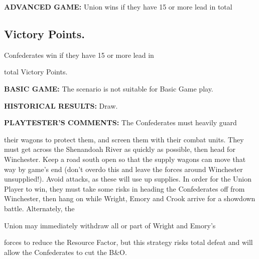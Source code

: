 \begin{scenariodata}
\textbf{ADVANCED GAME:} Union wins if they have 15 or more lead in total\\
\end{scenariodata}

\subsection*{Victory Points.}

\begin{scenariodata}
Confederates win if they have 15 or more lead in\\
\end{scenariodata}

total Victory Points.

\begin{scenariodata}
\textbf{BASIC GAME:} The scenario is not suitable for Basic Game play.\\
\end{scenariodata}

\begin{scenariodata}
\textbf{HISTORICAL RESULTS:} Draw.\\
\end{scenariodata}

\begin{scenariodata}
\textbf{PLAYTESTER'S COMMENTS:} The Confederates must heavily guard\\
\end{scenariodata}

their wagons to protect them, and screen them with their combat units. They must get across the Shenandoah River as quickly as possible, then head for Winchester. Keep a road south open so that the supply wagons can move that way by game's end (don't overdo this and leave the forces around Winchester unsupplied!). Avoid attacks, as these will use up supplies. In order for the Union Player to win, they must take some risks in heading the Confederates off from Winchester, then hang on while Wright, Emory and Crook arrive for a showdown battle. Alternately, the

\begin{scenariodata}
Union may immediately withdraw all or part of Wright and Emory's\\
\end{scenariodata}

forces to reduce the Resource Factor, but this strategy risks total defeat and will allow the Confederates to cut the B\&O.

